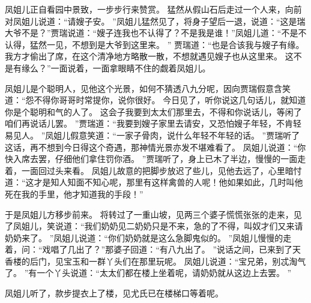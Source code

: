 \hop
凤姐儿正自看园中景致，一步步行来赞赏。
猛然从假山石后走过一个人来，向前对凤姐儿说道：“请嫂子安。
”凤姐儿猛然见了，将身子望后一退，说道：“这是瑞大爷不是？”贾瑞说道：“嫂子连我也不认得了？不是我是谁！”凤姐儿道：“不是不认得，猛然一见，不想到是大爷到这里来。
”
贾瑞道：“也是合该我与嫂子有缘。
我方才偷出了席，在这个清净地方略散一散，不想就遇见嫂子也从这里来。
这不是有缘么？”一面说着，一面拿眼睛不住的觑着凤姐儿。
\par
凤姐儿是个聪明人，见他这个光景，如何不猜透八九分呢，因向贾瑞假意含笑道：“怨不得你哥哥时常提你，说你很好。
今日见了，听你说这几句话儿，就知道你是个聪明和气的人了。
这会子我要到太太们那里去，不得和你说话儿，等闲了咱们再说话儿罢。
”贾瑞道：“我要到嫂子家里去请安，又恐怕嫂子年轻，不肯轻易见人。
”凤姐儿假意笑道：“一家子骨肉，说什么年轻不年轻的话。
”贾瑞听了这话，再不想到今日得这个奇遇，那神情光景亦发不堪难看了。
凤姐儿说道：“你快入席去罢，仔细他们拿住罚你酒。
”贾瑞听了，身上已木了半边，慢慢的一面走着，一面回过头来看。
凤姐儿故意的把脚步放迟了些儿，见他去远了，心里暗忖道：“这才是知人知面不知心呢，那里有这样禽兽的人呢！他如果如此，几时叫他死在我的手里，他才知道我的手段！”\par
于是凤姐儿方移步前来。
将转过了一重山坡，见两三个婆子慌慌张张的走来，见了凤姐儿，笑说道：“我们奶奶见二奶奶只是不来，急的了不得，叫奴才们又来请奶奶来了。
”凤姐儿说道：“你们奶奶就是这么急脚鬼似的。
”凤姐儿慢慢的走着，问：“戏唱了几出了？”那婆子回道：“有八九出了。
”说话之间，已来到了天香楼的后门，见宝玉和一群丫头们在那里玩呢。
凤姐儿说道：“宝兄弟，别忒淘气了。
”有一个丫头说道：“太太们都在楼上坐着呢，请奶奶就从这边上去罢。
”\par
凤姐儿听了，款步提衣上了楼，见尤氏已在楼梯口等着呢。

